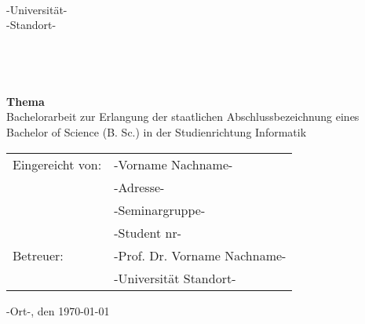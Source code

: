 \thispagestyle{empty}
\onehalfspacing

\begin{verbatim}


\end{verbatim}

\begin{center}
\begin{large}
-Universität-\\
-Standort-
\end{large}
\end{center}

\begin{verbatim}




\end{verbatim}
\begin{center}
\textbf{\Large{Thema}}\\
\vspace{6mm}
\large{Bachelorarbeit \linebreak 
zur Erlangung der staatlichen Abschlussbezeichnung eines \linebreak 
Bachelor of Science (B. Sc.)\linebreak
 in der Studienrichtung Informatik}
\end{center}

\vfill

\begin{flushleft}
\noindent \begin{tabular}{ll}
Eingereicht von: & -Vorname Nachname- \\ 
 & -Adresse- \\ 
 & -Seminargruppe- \\ 
 & -Student nr- \\ 
 Betreuer: & -Prof. Dr. Vorname Nachname- \\
 & -Universität Standort- \\
 
\end{tabular}
\end{flushleft}
\vspace{10mm}
\noindent  -Ort-, den \today\\


